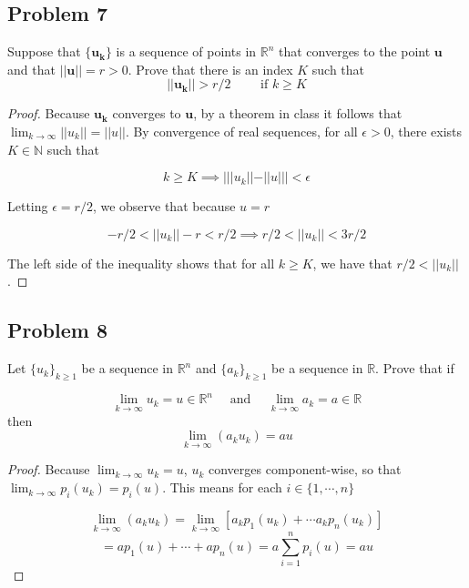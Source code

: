 \documentclass{article}
\begin{document}
\subsection*{Problem 7}
Suppose that $\mathbf{\{u_k\}}$ is a sequence of points in $\mathbb{R}^n$ that converges to the point $\mathbf{u}$ and that $||\mathbf{u}|| = r > 0$. Prove that there is an index $K$ such that
\[ ||\mathbf{u_k}|| > r/2 \qquad \text{ if } k \geq K\]

\begin{proof}

Because $\mathbf{u_k}$ converges to $\mathbf{u}$, by a theorem in class it follows that $\lim_{k\to\infty} || u_k || = || u ||$. By convergence of real sequences, for all $\epsilon > 0$, there exists $K \in \mathbb{N}$ such that

\[ k \geq K \implies | ||u_k||-||u|| | <  \epsilon \]

Letting $\epsilon = r/2$, we observe that because $u = r$

\[ -r/2 < ||u_k|| - r < r/2 \implies r/2 < ||u_k|| < 3r/2\]

The left side of the inequality shows that for all $k \geq K$, we have that $r/2 < ||u_k||$.

\end{proof}

\subsection*{Problem 8}
Let $\{u_k\}_{k \geq 1}$ be a sequence in $\mathbb{R}^n$ and $\{a_k\}_{k \geq 1}$ be a sequence in $\mathbb{R}$. Prove that if

\[ \lim_{k\to\infty} u_k = u \in \mathbb{R}^n \quad \text{ and } \quad \lim_{k\to\infty} a_k = a \in \mathbb{R} \]
then
\[ \lim_{k\to\infty} (a_ku_k) = au \]

\begin{proof}

Because $\lim_{k\to\infty} u_k = u$, $u_k$ converges component-wise, so that $\lim_{k\to\infty} p_i(u_k) = p_i(u)$. This means for each $i \in \{1, \cdots, n\}$

\[ \lim_{k\to\infty} (a_ku_k) = \lim_{k\to\infty} [a_kp_1(u_k) + \cdots a_kp_n(u_k)]\]
\[ = ap_1(u) + \cdots + ap_n(u) = a \sum_{i=1}^{n} p_i(u) = au\]

\end{proof}
\end{document}
